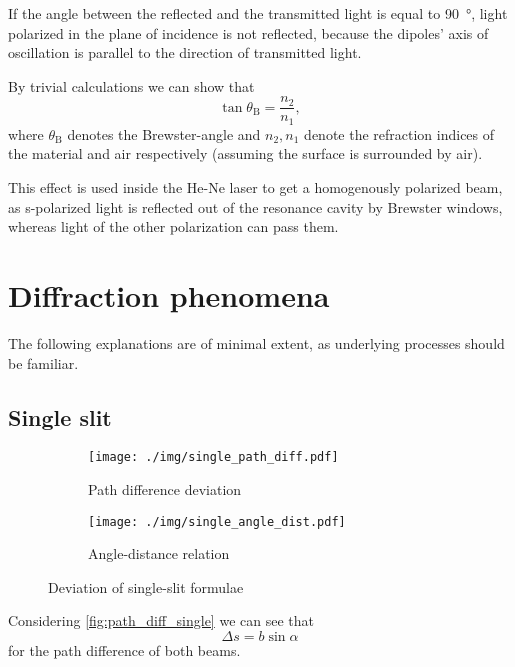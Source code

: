 If the angle between the reflected and the transmitted light is equal to \SI{90}{\degree}, light polarized in the plane of incidence is not reflected, because the dipoles' axis of oscillation is parallel to the direction of transmitted light.

By trivial calculations we can show that
\begin{equation}\label{eq:brewster}
	\tan\theta_\text{B}=\frac{n_2}{n_1},
\end{equation}
where $\theta_\text{B}$ denotes the Brewster-angle and $n_2, n_1$ denote the refraction indices of the material and air respectively (assuming the surface is surrounded by air).

This effect is used inside the He-Ne laser to get a homogenously polarized beam, as s-polarized light is reflected out of the resonance cavity by Brewster windows, whereas light of the other polarization can pass them.

\section{Diffraction phenomena}
The following explanations are of minimal extent, as underlying processes should be familiar.

\subsection{Single slit}\label{subsec:single_slit}

\begin{figure}[tb]
	\begin{subfigure}{.6\textwidth}
		\centering
		\texttt{[image: ./img/single\_path\_diff.pdf]}
		\caption[Single slit I]{Path difference deviation}
		\label{fig:path_diff_single}
	\end{subfigure}
	\begin{subfigure}{.5\textwidth}
		\centering
		\texttt{[image: ./img/single\_angle\_dist.pdf]}
		\caption[Single slit II]{Angle-distance relation}
		\label{fig:angle_distance_single}
	\end{subfigure}
	\caption[Deviation of single-slit formulae]{Deviation of single-slit formulae}
\end{figure}

Considering \autoref{fig:path_diff_single} we can see that	%
\begin{equation}\label{eq:path_diff}
	\Delta s=b\sin\alpha
\end{equation}
for the path difference of both beams.

